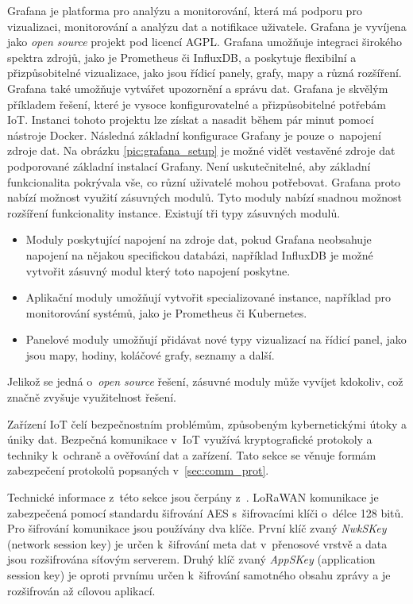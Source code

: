 
Grafana je platforma pro analýzu a monitorování, která má podporu pro vizualizaci, monitorování a analýzu dat a notifikace uživatele. Grafana je vyvíjena jako \textit{open source} projekt pod licencí AGPL. Grafana umožňuje integraci širokého spektra zdrojů, jako je Prometheus či InfluxDB, a poskytuje flexibilní a přizpůsobitelné vizualizace, jako jsou řídicí panely, grafy, mapy a různá rozšíření. Grafana také umožňuje vytvářet upozornění a správu dat. Grafana je skvělým příkladem řešení, které je vysoce konfigurovatelné a přizpůsobitelné potřebám IoT. Instanci tohoto projektu lze získat a nasadit během pár minut pomocí nástroje Docker. Následná základní konfigurace Grafany je pouze o~napojení zdroje dat. Na obrázku \ref{pic:grafana_setup} je možné vidět vestavěné zdroje dat podporované základní instalací Grafany. Není uskutečnitelné, aby základní funkcionalita pokrývala vše, co různí uživatelé mohou potřebovat. Grafana proto nabízí možnost využití zásuvných modulů. Tyto moduly nabízí snadnou možnost rozšíření funkcionality instance. Existují tři typy zásuvných modulů.
\begin{itemize}
    \item Moduly poskytující napojení na zdroje dat, pokud Grafana neobsahuje napojení na nějakou specifickou databázi, například InfluxDB je možné vytvořit zásuvný modul který toto napojení poskytne.
    \item Aplikační moduly umožňují vytvořit specializované instance, například pro monitorování systémů, jako je Prometheus či Kubernetes.
    \item Panelové moduly umožňují přidávat nové typy vizualizací na řídicí panel, jako jsou mapy, hodiny, koláčové grafy, seznamy a další.
\end{itemize}
Jelikož se jedná o~\textit{open source} řešení, zásuvné moduly může vyvíjet kdokoliv, což značně zvyšuje využitelnost řešení. \cite{grafana_docs}


 \label{sec:iot_zabezpeceni}
Zařízení IoT čelí bezpečnostním problémům, způsobeným kybernetickými útoky a úniky dat. Bezpečná komunikace v~IoT využívá kryptografické protokoly a techniky k~ochraně a ověřování dat a zařízení. Tato sekce se věnuje formám zabezpečení protokolů popsaných v~\ref{sec:comm_prot}.
\cite{buyya2016internet_POV3}

Technické informace z~této sekce jsou čerpány z~\cite{devalal2018lora}. LoRaWAN komunikace je zabezpečená pomocí standardu šifrování AES s~šifrovacími klíči o~délce 128 bitů. Pro šifrování komunikace jsou používány dva klíče. První klíč zvaný \textit{NwkSKey} (network session key) je určen k~šifrování meta dat v~přenosové vrstvě a data jsou rozšifrována síťovým serverem. Druhý klíč zvaný \textit{AppSKey} (application session key) je oproti prvnímu určen k~šifrování samotného obsahu zprávy a je rozšifrován až cílovou aplikací.

